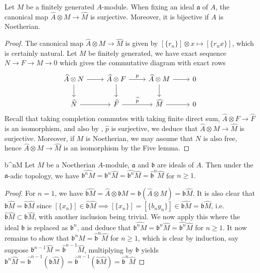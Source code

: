 \documentclass[10pt]{extarticle}
\begin{document}
\begin{corollary}{}{}
    Let $M$ be a finitely generated $A$-module. When fixing an ideal $\mathfrak{a}$ of $A$, the canonical map $\widehat{A}\otimes M\to\widehat{M}$ is surjective. Moreover, it is bijective if $A$ is Noetherian.
\end{corollary}
\begin{proof}
    The canonical map $\widehat{A}\otimes M\to \widehat{M}$ is given by $[\{r_n\}]\otimes x\mapsto [\{r_nx\}]$, which is certainly natural. Let $M$ be finitely generated, we have exact sequence $N\to F\to M\to 0$ which gives the commutative diagram with exact rows
    \[\begin{tikzcd}
	{\widehat{A}\otimes N} & {\widehat{A}\otimes F} & {\widehat{A}\otimes M} & 0 \\
	{\widehat{N}} & {\widehat{F}} & {\widehat{M}} & 0
	\arrow[from=1-1, to=1-2]
	\arrow[from=1-1, to=2-1]
	\arrow["p", from=1-2, to=1-3]
	\arrow[from=1-2, to=2-2]
	\arrow[from=1-3, to=1-4]
	\arrow[from=1-3, to=2-3]
	\arrow[from=2-1, to=2-2]
	\arrow["{\widehat{p}}", from=2-2, to=2-3]
	\arrow[from=2-3, to=2-4]
    \end{tikzcd}\]
    Recall that taking completion commutes with taking finite direct sum, $\widehat{A}\otimes F\to \widehat{F}$ is an isomorphism, and also by , $\widehat{p}$ is surjective, we deduce that $\widehat{A}\otimes M\to \widehat{M}$ is surjective. Moreover, if $M$ is Noetherian, we may assume that $N$ is also free, hence $\widehat{A}\otimes M\to \widehat{M}$ is an isomorphism by the Five lemma.
\end{proof}

\begin{corollary}{}{b^nM}
    Let $M$ be a Noetherian $A$-module, $\mathfrak{a}$ and $\mathfrak{b}$ are ideals of $A$. Then under the $\mathfrak{a}$-adic topology, we have $\widehat{\mathfrak{b}^n M}=\mathfrak{b}^n\widehat{M}=\widehat{\mathfrak{b}^n}\widehat{M}=\widehat{\mathfrak{b}}^n\widehat{M}$ for $n\geq 1$.
\end{corollary}
\begin{proof}
    For $n=1$, we have $\widehat{\mathfrak{b}M}=\widehat{A}\otimes \mathfrak{b}M=\mathfrak{b}(\widehat{A}\otimes M)=\mathfrak{b}\widehat{M}$. It is also clear that $\mathfrak{b}\widehat{M}=\widehat{\mathfrak{b}}\widehat{M}$ since $[\{x_n\}]\in\widehat{\mathfrak{b}}\widehat{M}\implies [\{x_n\}]=[\{b_ny_n\}]\in \widehat{\mathfrak{b}M}=\mathfrak{b}\widehat{M}$, i.e. $\widehat{\mathfrak{b}}\widehat{M}\subset \mathfrak{b}\widehat{M}$, with another inclusion being trivial. We now apply this where the ideal $\mathfrak{b}$ is replaced as $\mathfrak{b}^n$, and deduce that $\widehat{\mathfrak{b}^n M}=\mathfrak{b}^n\widehat{M}=\widehat{\mathfrak{b}^n}\widehat{M}$ for $n\geq 1$. It now remains to show that $\mathfrak{b}^n\widehat{M}=\widehat{\mathfrak{b}}^n\widehat{M}$ for $n\geq 1$, which is clear by induction, say suppose $\mathfrak{b}^{n-1}\widehat{M}=\widehat{\mathfrak{b}}^{n-1}\widehat{M}$, multiplying by $\mathfrak{b}$ yields $\mathfrak{b}^n\widehat{M}=\widehat{\mathfrak{b}}^{n-1}\left(\mathfrak{b}\widehat{M}\right)=\widehat{\mathfrak{b}}^{n-1}\left(\widehat{\mathfrak{b}}\widehat{M}\right)=\widehat{\mathfrak{b}}^n\widehat{M}$
\end{proof}
\end{document}
